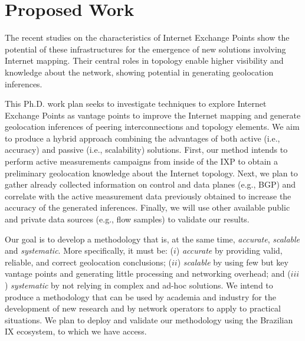 \chapter{Proposed Work}\label{cap:proposal}
\thispagestyle{empty}


	The recent studies on the characteristics of Internet Exchange Points show the potential of these infrastructures for the emergence of new solutions involving Internet mapping. Their central roles in topology enable higher visibility and knowledge about the network, showing potential in generating geolocation inferences.

	This Ph.D. work plan seeks to investigate techniques to explore Internet Exchange Points as vantage points to improve the Internet mapping and generate geolocation inferences of peering interconnections and topology elements.  We aim to produce a hybrid approach combining the advantages of both active (i.e., accuracy) and passive (i.e., scalability) solutions. First, our method intends to perform active measurements campaigns from inside of the IXP to obtain a preliminary geolocation knowledge about the Internet topology. Next, we plan to gather already collected information on control and data planes (e.g., BGP) and correlate with the active measurement data previously obtained to increase the accuracy of the generated inferences. Finally, we will use other available public and private data sources (e.g., flow samples) to validate our results.

	Our goal is to develop a methodology that is, at the same time, \emph{accurate}, \emph{scalable} and \emph{systematic}. More specifically, it must be: ($i$) \emph{accurate} by providing valid, reliable, and correct geolocation conclusions; ($ii$) \emph{scalable} by using few but key vantage points and generating little processing and networking overhead; and ($iii$) \emph{systematic} by not relying in complex and ad-hoc solutions. We intend to produce a methodology that can be used by academia and industry for the development of new research and by network operators to apply to practical situations. We plan to deploy and validate our methodology using the Brazilian IX ecosystem, to which we have access.

